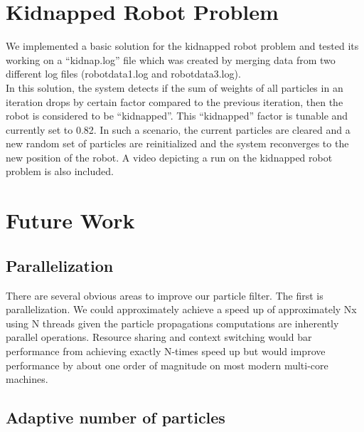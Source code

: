 \documentclass{article}
\begin{document}
\section{Kidnapped Robot Problem}

We implemented a basic solution for the kidnapped robot problem and tested its working on a ``kidnap.log'' file which was created by merging data from two different log files (robotdata1.log and robotdata3.log). \\
In this solution, the system detects if the sum of weights of all particles in an iteration drops by certain factor compared to the previous iteration, then the robot is considered to be ``kidnapped''. This ``kidnapped'' factor is tunable and currently set to 0.82. In such a scenario, the current particles are cleared and a new random set of particles are reinitialized and the system reconverges to the new position of the robot. A video depicting a run on the kidnapped robot problem is also included.

\section{Future Work}

\subsection{Parallelization}
There are several obvious areas to improve our particle filter.  The first is parallelization. We could approximately achieve a speed up of approximately Nx using N threads given the particle propagations computations are inherently parallel operations. Resource sharing and context switching would bar performance from achieving exactly N-times speed up but would improve performance by about one order of magnitude on most modern multi-core machines.

\subsection{Adaptive number of particles}
\end{document}
